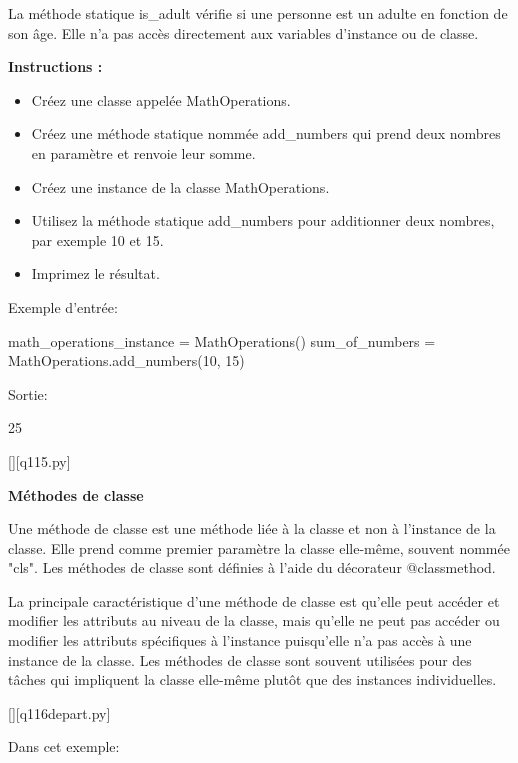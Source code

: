    La méthode statique is\_adult vérifie si une personne est un adulte en fonction de son âge. Elle n'a pas accès directement aux variables d'instance ou de classe.

		\textbf{Instructions :}

    \begin{itemize}
    \item Créez une classe appelée MathOperations.
    \item Créez une méthode statique nommée add\_numbers qui prend deux nombres en paramètre et renvoie leur somme.
    \item Créez une instance de la classe MathOperations.
    \item Utilisez la méthode statique add\_numbers pour additionner deux nombres, par exemple 10 et 15.
    \item Imprimez le résultat.
    \end{itemize}
		
		Exemple d'entrée:
		
		math\_operations\_instance = MathOperations()
		sum\_of\_numbers = MathOperations.add\_numbers(10, 15)
		
		Sortie:
		
		25
		\par
		\renewcommand{\nomfichier}{q115.py}
		\begin{solution}
		    \pythonfile{\chemincode \nomfichier}[][\nomfichier]
		\end{solution}
        
        \question
		\textbf{Méthodes de classe}
		
		Une méthode de classe est une méthode liée à la classe et non à l'instance de la classe. Elle prend comme premier paramètre la classe elle-même, souvent nommée "cls". Les méthodes de classe sont définies à l'aide du décorateur @classmethod.
		
		La principale caractéristique d'une méthode de classe est qu'elle peut accéder et modifier les attributs au niveau de la classe, mais qu'elle ne peut pas accéder ou modifier les attributs spécifiques à l'instance puisqu'elle n'a pas accès à une instance de la classe. Les méthodes de classe sont souvent utilisées pour des tâches qui impliquent la classe elle-même plutôt que des instances individuelles.
		
		\renewcommand{\nomfichier}{q116depart.py}
		\pythonfile{\chemincode \nomfichier}[][\nomfichier]
		
		Dans cet exemple:
		
